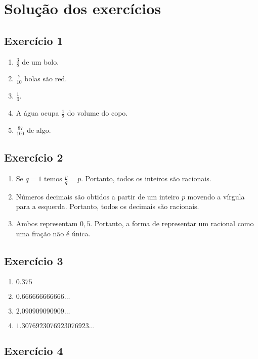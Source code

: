 \section{Solução dos exercícios}

\subsection*{Exercício 1}

\begin{enumerate}
\item $\frac{3}{8}$ de um bolo.
\item $\frac{7}{10}$ bolas são red.
\item $\frac{1}{4}$.
\item A água ocupa $\frac{1}{2}$ do volume do copo.
\item $\frac{87}{100}$ de algo.
\end{enumerate}

\subsection*{Exercício 2}

\begin{enumerate}
\item Se $q = 1$ temos $\frac{p}{q} = p$. Portanto, todos os inteiros são
  racionais.
\item Números decimais são obtidos a partir de um inteiro $p$ movendo a vírgula
  para a esquerda. Portanto, todos os decimais são racionais.
\item Ambos representam $0,5$. Portanto, a forma de representar um racional como
  uma fração não é única.
\end{enumerate}

\subsection*{Exercício 3}

\begin{enumerate}
\item $0.375$
\item $0.666666666666\ldots$
\item $2.090909090909\ldots$
\item $1.3076923076923076923\ldots$
\end{enumerate}

\subsection*{Exercício 4}

